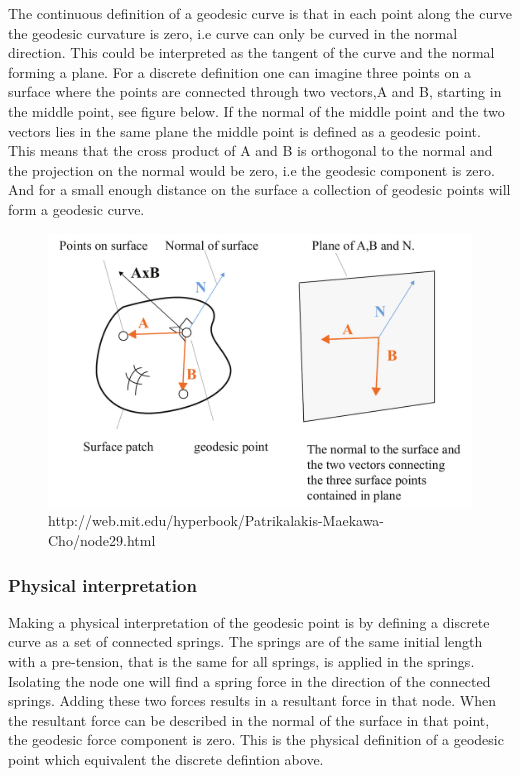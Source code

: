 The continuous definition of a geodesic curve is that in each point along the curve the geodesic curvature is zero, i.e curve can only be curved in the normal direction. This could be interpreted as the tangent of the curve and the normal forming a plane. For a discrete definition one can imagine three points on a surface where the points are connected through two vectors,A and B, starting in the middle point, see figure below. If the normal of the middle point and the two vectors lies in the same plane the middle point is defined as a geodesic point. This means that the cross product of A and B is orthogonal to the normal and the projection on the normal would be zero, i.e the geodesic component is zero. And for a small enough distance on the surface a collection of geodesic points will form a geodesic curve.

\begin{figure}[H]
\centering
\includegraphics[width = 0.8\linewidth ]{figure/Method/defintionGeodeiscPoint.pdf}
\caption{http://web.mit.edu/hyperbook/Patrikalakis-Maekawa-Cho/node29.html}
\end{figure}

\subsubsection{Physical interpretation} \label{physdef}

Making a physical interpretation of the geodesic point is by defining a discrete curve as a set of connected springs. The springs are of the same initial length with a pre-tension, that is the same for all springs, is applied in the springs. Isolating the node one will find a spring force in the direction of the connected springs. Adding these two forces results in a resultant force in that node. When the resultant force can be described in  the normal of the surface in that point, the geodesic force component is zero. This is the physical definition of a geodesic point which equivalent the discrete defintion above.

